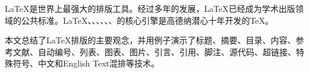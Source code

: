\LaTeX{}是世界上最强大的排版工具。经过多年的发展，\LaTeX{}已经成为学术出版领域的公共标准。\LaTeX{}、\XeTeX{}、\XeLaTeX{}、\LaTeXe{}、\MF{}、\AmS{}、\MP{}的核心引擎是高德纳潜心十年开发的\TeX{}。

本文总结了\LaTeX{}排版的主要观念，并用例子演示了标题、摘要、目录、内容、参考文献、自动编号、列表、图表、图片、引言、引用、脚注、源代码、超链接、特殊符号、中文和English Text混排等技术。